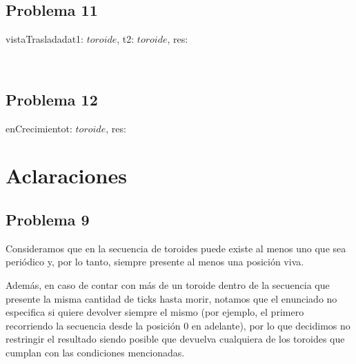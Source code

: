 \documentclass[a4paper]{article}
\begin{document}
    	\newpage
    	
    	\subsection{Problema 11}
	
	    \begin{proc}{vistaTrasladada}{\In t1: $toroide$, \In t2: $toroide$, \Out res: \bool}{}
    	\end{proc} \\
    	
    	\subsection{Problema 12}
    	
    	\begin{proc}{enCrecimiento}{\In t: $toroide$, \Out res: \bool}{}
    	\end{proc} 
    	
    	
	
	\section{Aclaraciones}
	    
	    \subsection{Problema 9}
	    
	        Consideramos que en la secuencia de toroides puede existe al menos uno que sea periódico y, por lo tanto, siempre presente al menos una posición viva. \vspace{1em}
	    
	        Además, en caso de contar con más de un toroide dentro de la secuencia que presente la misma cantidad de ticks hasta morir, notamos que el enunciado no especifica si quiere devolver siempre el mismo (por ejemplo, el primero recorriendo la secuencia desde la posición 0 en adelante), por lo que decidimos no restringir el resultado siendo posible que devuelva cualquiera de los toroides que cumplan con las condiciones mencionadas.
	    
\end{document}
